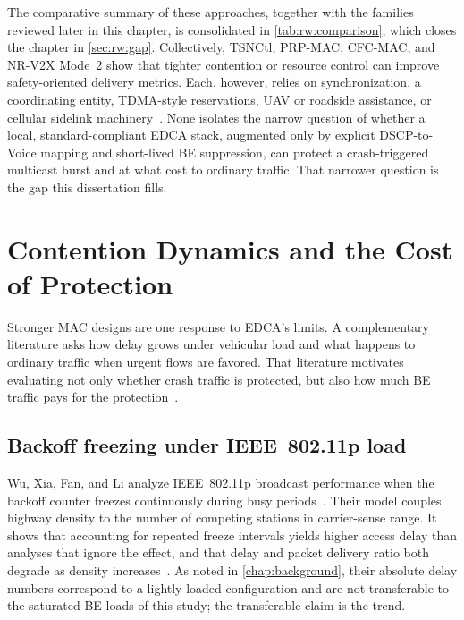 The comparative summary of these approaches, together with the families reviewed later in this chapter, is consolidated in \autoref{tab:rw:comparison}, which closes the chapter in \autoref{sec:rw:gap}.
Collectively, TSNCtl, PRP-MAC, CFC-MAC, and NR-V2X Mode~2 show that tighter contention or resource control can improve safety-oriented delivery metrics.
Each, however, relies on synchronization, a coordinating entity, TDMA-style reservations, UAV or roadside assistance, or cellular sidelink machinery~\cite{TSNCtl_Feraudo,PRP_MAC_Li,CFC_MAC_Linn,CV2X_Sidelink_Allocation}.
None isolates the narrow question of whether a local, standard-compliant EDCA stack, augmented only by explicit DSCP-to-Voice mapping and short-lived BE suppression, can protect a crash-triggered multicast burst and at what cost to ordinary traffic.
That narrower question is the gap this dissertation fills.

\section{Contention Dynamics and the Cost of Protection}
\label{sec:rw:dynamics}

Stronger MAC designs are one response to EDCA's limits.
A complementary literature asks how delay grows under vehicular load and what happens to ordinary traffic when urgent flows are favored.
That literature motivates evaluating not only whether crash traffic is protected, but also how much BE traffic pays for the protection~\cite{Evolution_QoS_Mechanisms,kosekszott2012What}.

\subsection{Backoff freezing under IEEE~802.11p load}
\label{sec:rw:freezing}

Wu, Xia, Fan, and Li analyze IEEE~802.11p broadcast performance when the backoff counter freezes continuously during busy periods~\cite{Continuous_Backoff_Freezing_Li}.
Their model couples highway density to the number of competing stations in carrier-sense range.
It shows that accounting for repeated freeze intervals yields higher access delay than analyses that ignore the effect, and that delay and packet delivery ratio both degrade as density increases~\cite{Continuous_Backoff_Freezing_Li}.
As noted in \autoref{chap:background}, their absolute delay numbers correspond to a lightly loaded configuration and are not transferable to the saturated BE loads of this study; the transferable claim is the trend.

